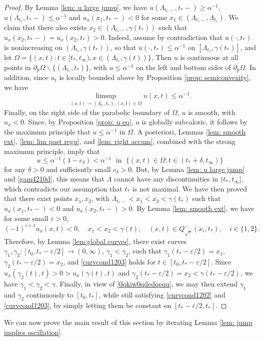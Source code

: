 \documentclass{article}
\numberwithin{equation}{section}
\numberwithin{figure}{section}
\theoremstyle{plain}
\theoremstyle{plain}
\theoremstyle{plain}
\theoremstyle{plain}
\theoremstyle{definition}
\theoremstyle{remark}
\def\vep{\varepsilon}
\begin{document}
\begin{proof}
By Lemma \ref{lem: u large jump}, we have $u(\Lambda_{t_*-},t_*-)\geq \alpha^{-1}$, $u(\Lambda_{t_*},t_*-)\leq \alpha^{-1}$ and $u_x(x_1,t_*-)<0$ for some $x_1\in (\Lambda_{t_*-},\Lambda_{t_*})$. We claim that there also exists $x_2\in (\Lambda_{t_*-},\gamma(t_*))$ such that $u_x(x_2,t_*-)=u_x(x_2,t_*)>0$. Indeed, assume by contradiction that $u(\cdot,t_*)$ is nonincreasing on $(\Lambda_{t_*},\gamma(t_*))$, so that $u(\cdot,t_*)\leq \alpha^{-1}$ on $[\Lambda_{t_*},\gamma(t_*)]$, and let $\Omega=\{(x,t): t\in [t_*,t_{\infty}), x\in (\Lambda_{t_*},\gamma(t))\}$. Then $u$ is continuous at all points in $\partial_p{\Omega}\backslash \{(\Lambda_{t_*},t_*)\}$, with $u\leq \alpha^{-1}$ on the left and bottom sides of $\partial_p{\Omega}$. In addition, since $u_t$ is locally bounded above by Proposition \ref{prop: semiconvexity}, we have
\[ \limsup_{(x,t)\to (\Lambda_{t_*},t_*), (x,t)\in \Omega}u(x,t)\leq \alpha^{-1}.\]
Finally, on the right side of the parabolic boundary of $\Omega$, $u$ is smooth, with $u_x<0$. Since, by Proposition \ref{prop: u eq}, $u$ is globally subcaloric, it follows by the maximum principle that $u\leq \alpha^{-1}$ in $\Omega$. A posteriori, Lemmas \ref{lem: smooth ext}, \ref{lem: lim past regu}, and \ref{lem: right accum}, combined with the strong maximum principle, imply that \[u\leq \alpha^{-1}(1-c_{\delta})<\alpha^{-1} \;\text{ in }\;\{(x,t)\in \Omega: t\in (t_*+\delta,t_{\infty})\}\] for any $\delta>0$ and sufficiently small $c_{\delta}>0$. But, by Lemma \ref{lem: u large jump} and \eqref{gam4210d}, this means that $\Lambda$ cannot have any discontinuities in $(t_*,t_{\infty}]$, which contradicts our assumption that $t_*$ is not maximal. We have then proved that there exist points $x_1, x_2$, with $\Lambda_{t_*-}<x_1<x_2<\gamma(t_*)$ such that $u_x(x_1,t_*-)<0$ and $u_x(x_2,t_*-)>0$. By Lemma \ref{lem: smooth ext}, we have for some small $\vep>0$,
\begin{equation} \label{0qkiw0qdedqequ}(-1)^{i+1}u_x(x,t)<0, \quad x_1<x_2<\gamma(t),\quad (x,t)\in Q^-_{\sqrt{\vep}}(x_i,t_*), \quad i\in \{1,2\}.\end{equation}
 Therefore, by Lemma \ref{lem:global curves}, there exist curves $\gamma_1,\gamma_2:[t_0,t_*-\vep/2]\to (0,\infty)$, $\gamma_1<\gamma_2$, such that $\gamma_1(t_*-\vep/2)=x_1$, $\gamma_2(t_*-\vep/2)=x_2$, and \eqref{curvcond1203} holds for $t\in [t_0,t_*-\vep/2]$. Since $u_x(\gamma_2(t),t)>0>u_x(\gamma(t),t)$ and $\gamma_2(t_*-\vep/2)=x_2<\gamma(t_*-\vep/2)$, we have $\gamma_1<\gamma_2<\gamma$. Finally, in view of \eqref{0qkiw0qdedqequ}, we may then extend $\gamma_1$ and $\gamma_2$ continuously to $[t_0,t_*]$, while still satisfying \eqref{curvcond1202} and \eqref{curvcond1203}, by simply letting them be constant on $[t_*-\vep/2,t_*]$.
\end{proof}
We can now prove the main result of this section by iterating Lemma \ref{lem: jump implies oscillation}.
\end{document}
